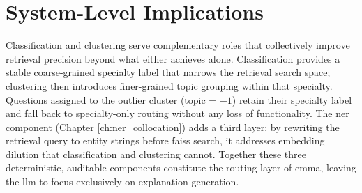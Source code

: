 \section{System-Level Implications}
Classification and clustering serve complementary roles that collectively improve retrieval precision beyond what either achieves alone. Classification provides a stable coarse-grained specialty label that narrows the retrieval search space; clustering then introduces finer-grained topic grouping within that specialty. Questions assigned to the outlier cluster (topic = $-1$) retain their specialty label and fall back to specialty-only routing without any loss of functionality. The \gls{ner} component (Chapter \ref{ch:ner_collocation}) adds a third layer: by rewriting the retrieval query to entity strings before \gls{faiss} search, it addresses embedding dilution that classification and clustering cannot. Together these three deterministic, auditable components constitute the routing layer of \gls{emma}, leaving the \gls{llm} to focus exclusively on explanation generation.
